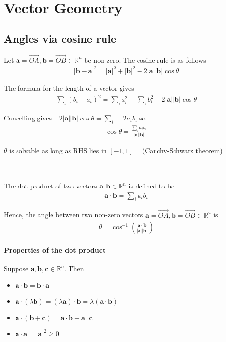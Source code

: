 \documentclass{report}
\begin{document}
\chapter{Vector Geometry}

\section{Angles via cosine rule}

	Let $\mathbf{a} = \overrightarrow{OA}, \mathbf{b} = \overrightarrow{OB} \in \mathbb{R}^n$ be non-zero. The cosine rule is as follows
		\begin{align*}
			|\mathbf{b} - \mathbf{a}|^2 = |\mathbf{a}|^2 + |\mathbf{b}|^2 - 2|\mathbf{a}||\mathbf{b}| \cos{\theta}
		\end{align*}

	The formula for the length of a vector gives
		\begin{align*}
			\sum_i (b_i - a_i)^2 = \sum_i a_i^2 + \sum_i b_i^2 - 2|\mathbf{a}||\mathbf{b}| \cos{\theta}
		\end{align*}

	Cancelling gives $-2 |\mathbf{a}||\mathbf{b}| \cos{\theta} = \sum_i -2 a_i b_i$ so
		\begin{align*}
			\cos{\theta} = \frac{\sum_i a_i b_i}{|\mathbf{a}||\mathbf{b}|}
		\end{align*}

	$\theta$ is solvable as long as RHS lies in $[-1,1] \quad$ (Cauchy-Schwarz theorem)

	\\ \\
	The dot product of two vectors $\mathbf{a}, \mathbf{b} \in \mathbb{R}^n$ is defined to be
		\begin{align*}
			\mathbf{a} \cdot \mathbf{b} = \sum_i a_i b_i
		\end{align*}
	
	Hence, the angle between two non-zero vectors $\mathbf{a} = \overrightarrow{OA}, \mathbf{b} = \overrightarrow{OB} \in \mathbb{R}^n$ is
		\begin{align*}
			\theta = \cos^{-1}{\left(\frac{\mathbf{a} \cdot \mathbf{b}}{|\mathbf{a}||\mathbf{b}|}\right)}
		\end{align*}

	\subsubsection{Properties of the dot product}

		Suppose $\mathbf{a}, \mathbf{b}, \mathbf{c} \in \mathbb{R}^n$. Then
			\begin{itemize}
				\item $\mathbf{a} \cdot \mathbf{b} = \mathbf{b} \cdot \mathbf{a}$
				\item $\mathbf{a} \cdot (\lambda \mathbf{b}) = (\lambda \mathbf{a}) \cdot \mathbf{b} = \lambda(\mathbf{a} \cdot \mathbf{b})$
				\item $\mathbf{a} \cdot (\mathbf{b} + \mathbf{c}) = \mathbf{a} \cdot \mathbf{b} + \mathbf{a} \cdot \mathbf{c}$
				\item $\mathbf{a} \cdot \mathbf{a} = |\mathbf{a}|^2 \geq 0$
			\end{itemize}
\end{document}
